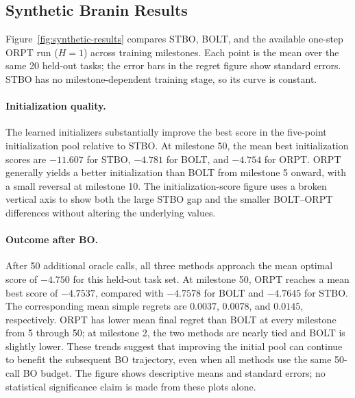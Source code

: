 \subsection{Synthetic Branin Results}
\label{sec:synthetic-results}

Figure~\ref{fig:synthetic-results} compares STBO, BOLT, and the
available one-step ORPT run ($H=1$) across training milestones. Each point is the mean over the same 20 held-out tasks;
the error bars in the regret figure show standard errors. STBO has no
milestone-dependent training stage, so its curve is constant.

\paragraph{Initialization quality.}
The learned initializers substantially improve the best score in the
five-point initialization pool relative to STBO. At milestone 50, the mean
best initialization scores are $-11.607$ for STBO, $-4.781$ for BOLT,
and $-4.754$ for ORPT. ORPT generally yields a better initialization than
BOLT from milestone 5 onward, with a small reversal at milestone 10. The
initialization-score figure uses a broken vertical axis to show both the
large STBO gap and the smaller BOLT--ORPT differences without altering the
underlying values.

\paragraph{Outcome after BO.}
After 50 additional oracle calls, all three methods approach the mean
optimal score of $-4.750$ for this held-out task set. At milestone 50,
ORPT reaches a mean best score of $-4.7537$, compared with $-4.7578$ for
BOLT and $-4.7645$ for STBO. The corresponding mean simple regrets are
$0.0037$, $0.0078$, and $0.0145$, respectively. ORPT has lower mean final
regret than BOLT at every milestone from 5 through 50; at milestone 2,
the two methods are nearly tied and BOLT is slightly lower. These trends
suggest that improving the initial pool can continue to benefit the
subsequent BO trajectory, even when all methods use the same 50-call BO
budget. The figure shows descriptive means and standard errors; no
statistical significance claim is made from these plots alone.
